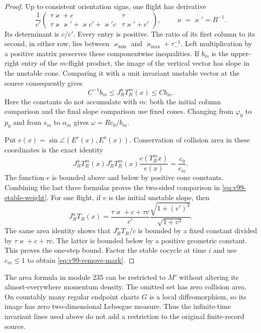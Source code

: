 \begin{proof}
Up to consistent orientation signs, one flight has derivative
\[
 \frac1{c'}
 \begin{pmatrix}
 \tau\varkappa+c&\tau\\
 \tau\varkappa\varkappa'+\varkappa c'+\varkappa'c&
                         \tau\varkappa'+c'
 \end{pmatrix},\qquad \varkappa=\varkappa'=R^{-1}.
\]
Its determinant is $c/c'$. Every entry is positive. The ratio of
its first column to its second, in either row, lies between
$\varkappa_{\min}$ and
$\varkappa_{\max}+\tau_-^{-1}$. Left multiplication by a positive
matrix preserves these componentwise inequalities. If $b_m$ is the
upper-right entry of the $m$-flight product, the image of the vertical
vector has slope in the unstable cone. Comparing it with a unit
invariant unstable vector at the source consequently gives
\[
           C^{-1}b_m\le J^u_RT_R^m(x)\le Cb_m.
\]
Here the constants do not accumulate with $m$: both the initial
column comparison and the final slope comparison use fixed cones.
Changing from $\varphi_0$ to $p_0$ and from $s_m$ to $\alpha_m$
gives $\omega=Rc_0/b_m$.

Put $e(x)=\sin\angle(E^s(x),E^u(x))$. Conservation of collision
area in these coordinates is the exact identity
\[
 J^u_RT_R^m(x)J^s_RT_R^m(x)
                    \frac{e(T_R^mx)}{e(x)}=\frac{c_0}{c_m}.
\]
The function $e$ is bounded above and below by positive cone
constants. Combining the last three formulas proves the two-sided
comparison in \eqref{eq:v99-stable-weight}.
For one flight, if $v$ is the initial unstable slope, then
\[
 J^u_RT_R(x)=
 \frac{\tau\varkappa+c+\tau v}{c'}
                  \frac{\sqrt{1+(v')^2}}{\sqrt{1+v^2}}.
\]
The same area identity shows that $J^s_RT_R/c$ is bounded by a
fixed constant divided by $\tau\varkappa+c+\tau v$. The latter is
bounded below by a positive geometric constant. This proves the
one-step bound. Factor the stable cocycle at time $i$ and use
$c_m\le1$ to obtain \eqref{eq:v99-remove-mark}.
\end{proof}

The area formula in module 235 can be restricted to $M'$ without
altering its almost-everywhere momentum density. The omitted set has
zero collision area. On countably many regular endpoint charts $G$
is a local diffeomorphism, so its image has zero two-dimensional
Lebesgue measure. Thus the infinite-time invariant lines used above
do not add a restriction to the original finite-record source.
